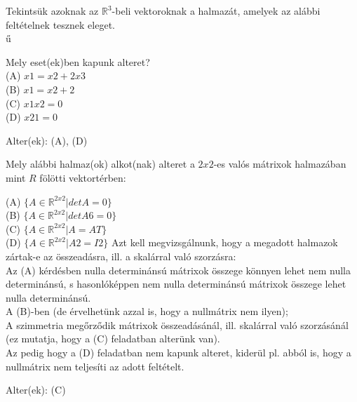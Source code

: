 \begin{frame}
  \begin{tcolorbox}[title={2/3. -R-}]
      Tekintsük azoknak az $\mathbb{R}^3$-beli  vektoroknak a halmazát, amelyek az alábbi feltételnek tesznek eleget.\\ű
      
      Mely eset(ek)ben kapunk alteret?\\
      (A) $x1 = x2 + 2x3$\\
      (B) $x1 = x2 + 2$\\
      (C) $x1x2 = 0$\\
      (D) $x2 1 = 0$
  \tcblower

    \mmedskip
    
    Alter(ek): (A), (D)
  \end{tcolorbox}
\end{frame}

\begin{frame}
  \begin{tcolorbox}[title={2/4. -Q-}]
      Mely alábbi halmaz(ok) alkot(nak) alteret a $2x2$-es valós mátrixok halmazában mint $R$ fölötti vektortérben:\\
      \mmedskip
      
      (A) $\{A \in \mathbb{R}^{2 x 2}|detA = 0\}$\\
      (B) $\{A \in \mathbb{R}^{2 x 2}|detA 6= 0\}$\\
      (C) $\{A \in \mathbb{R}^{2 x 2}|A = AT\}$\\
      (D) $\{A \in \mathbb{R}^{2 x 2}|A2 = I2\}$
  \tcblower
    Azt kell megvizsgálnunk, hogy a megadott halmazok zártak-e az összeadásra, ill. a skalárral való szorzásra:\\

    Az (A) kérdésben nulla determinánsú mátrixok összege könnyen lehet nem nulla determinánsú, s hasonlóképpen nem nulla determinánsú mátrixok összege lehet nulla determinánsú.\\
    
    A (B)-ben (de érvelhetünk azzal is, hogy a nullmátrix nem ilyen);\\

    A szimmetria megőrződik mátrixok összeadásánál, ill. skalárral való szorzásánál (ez mutatja, hogy a (C) feladatban alterünk van).\\

    Az pedig hogy a (D) feladatban nem kapunk alteret, kiderül pl. abból is, hogy a nullmátrix nem teljesíti az adott feltételt. 
    \mmedskip 
    
    Alter(ek): (C)
  \end{tcolorbox}
\end{frame}

